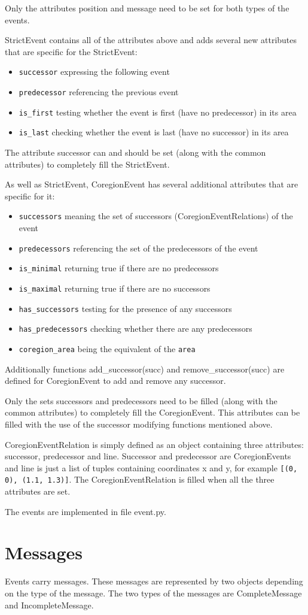 \documentclass[11pt,oneside]{fithesis2}
\newcommand{\T}[1]{\texttt{#1}}
\newcommand{\ite}[1]{\item{\texttt{#1}}}
\begin{document}
Only the attributes position and message need to be set for both types of the events.

StrictEvent contains all of the attributes above and adds several new attributes that are specific for the StrictEvent:
\begin{itemize}
\ite{successor} expressing the following event
\ite{predecessor} referencing the previous event
\ite{is\_first} testing whether the event is first (have no predecessor) in its area
\ite{is\_last} checking whether the event is last (have no successor) in its area
\end{itemize}

The attribute successor can and should be set (along with the common attributes) to completely fill the StrictEvent.

As well as StrictEvent, CoregionEvent has several additional attributes that are specific for it:
\begin{itemize}
\ite{successors} meaning the set of successors (CoregionEventRelations) of the event
\ite{predecessors} referencing  the set of the predecessors of the event
\ite{is\_minimal} returning true if there are no predecessors
\ite{is\_maximal} returning true if there are no successors
\ite{has\_successors} testing for the presence of any successors
\ite{has\_predecessors} checking whether there are any predecessors
\ite{coregion\_area} being the equivalent of the \T{area}
\end{itemize}

Additionally functions add\_successor(succ) and remove\_successor(succ) are defined for CoregionEvent to add and remove any successor.

Only the sets successors and predecessors need to be filled (along with the common attributes) to completely fill the CoregionEvent. This attributes can be filled with the use of the successor modifying functions mentioned above.

CoregionEventRelation is simply defined as an object containing three attributes: successor, predecessor and line. Successor and predecessor are CoregionEvents and line is just a list of tuples containing coordinates x and y, for example \T{[(0, 0), (1.1, 1.3)]}. The CoregionEventRelation is filled when all the three attributes are set.

The events are implemented in file event.py.


\section{Messages}
Events carry messages. These messages are represented by two objects depending on the type of the message. The two types of the messages are CompleteMessage and IncompleteMessage.
\end{document}
